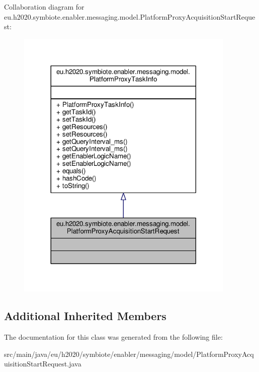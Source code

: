 Collaboration diagram for eu.\+h2020.\+symbiote.\+enabler.\+messaging.\+model.\+Platform\+Proxy\+Acquisition\+Start\+Request\+:
\nopagebreak
\begin{figure}[H]
\begin{center}
\leavevmode
\includegraphics[width=296pt]{classeu_1_1h2020_1_1symbiote_1_1enabler_1_1messaging_1_1model_1_1PlatformProxyAcquisitionStartRequest__coll__graph}
\end{center}
\end{figure}
\subsection*{Additional Inherited Members}


The documentation for this class was generated from the following file\+:\begin{DoxyCompactItemize}
\item 
src/main/java/eu/h2020/symbiote/enabler/messaging/model/Platform\+Proxy\+Acquisition\+Start\+Request.\+java\end{DoxyCompactItemize}
